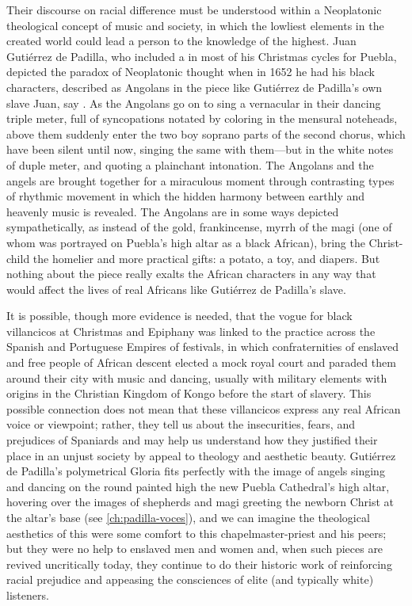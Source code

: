 Their discourse on racial difference must be understood within a Neoplatonic
theological concept of music and society, in which the lowliest elements in the
created world could lead a person to the knowledge of the highest.
Juan Gutiérrez de Padilla, who included a  in most of
his Christmas cycles for Puebla, depicted the paradox of Neoplatonic thought
when in 1652 he had his black characters, described as Angolans in the piece
like Gutiérrez de Padilla's own slave Juan, say .
As the Angolans go on to sing a vernacular  in their
dancing triple meter, full of syncopations notated by coloring in the mensural
noteheads, above them suddenly enter the two boy soprano parts of the second
chorus, which have been silent until now, singing the same  with
them---but in the white notes of duple meter, and quoting a plainchant
intonation.
The Angolans and the angels are brought together for a miraculous moment
through contrasting types of rhythmic movement in which the hidden harmony
between earthly and heavenly music is revealed.
The Angolans are in some ways depicted sympathetically, as instead
of the gold, frankincense, myrrh of the magi (one of whom was portrayed on
Puebla's high altar as a black African), bring the Christ-child the homelier
and more practical gifts: a potato, a toy, and diapers.
But nothing about the piece really exalts the African characters in any way
that would affect the lives of real Africans like Gutiérrez de Padilla's slave.

It is possible, though more evidence is needed, that the vogue for black
villancicos at Christmas and Epiphany was linked to the practice across the
Spanish and Portuguese Empires of  festivals, in which
confraternities of enslaved and free people of African descent elected a mock
royal court and paraded them around their city with music and dancing, usually
with military elements with origins in the Christian Kingdom of Kongo before
the start of slavery.%
    \citXXX[sources]
This possible connection does not mean that these villancicos express any real
African voice or viewpoint; rather, they tell us about the insecurities, fears,
and prejudices of Spaniards and may help us understand how they justified their
place in an unjust society by appeal to theology and aesthetic beauty.
Gutiérrez de Padilla's polymetrical Gloria fits perfectly with the image of
angels singing and dancing on the round painted high the new Puebla
Cathedral's high altar, hovering over the images of shepherds and magi greeting
the newborn Christ at the altar's base (see \cref{ch:padilla-voces}), and we
can imagine the theological aesthetics of this were some comfort to this
chapelmaster-priest and his peers; but they were no help to enslaved men and
women and, when such pieces are revived uncritically today, they continue to do
their historic work of reinforcing racial prejudice and appeasing the
consciences of elite (and typically white) listeners.

